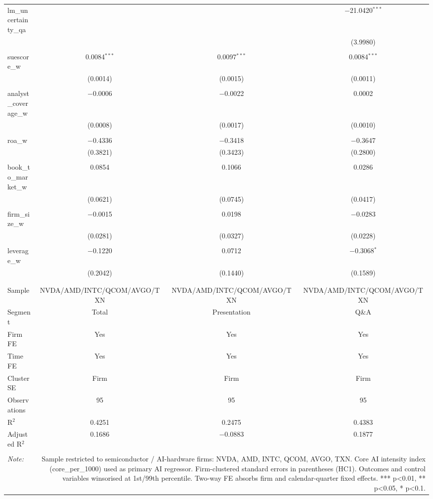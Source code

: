 \begin{table}[!htbp]
\begin{tabular}{@{\extracolsep{5pt}}lccc}
 lm\_uncertainty\_qa &  &  & $-$21.0420$^{***}$ \\ 
  &  &  & (3.9980) \\ 
  & & & \\ 
 suescore\_w & 0.0084$^{***}$ & 0.0097$^{***}$ & 0.0084$^{***}$ \\ 
  & (0.0014) & (0.0015) & (0.0011) \\ 
  & & & \\ 
 analyst\_coverage\_w & $-$0.0006 & $-$0.0022 & 0.0002 \\ 
  & (0.0008) & (0.0017) & (0.0010) \\ 
  & & & \\ 
 roa\_w & $-$0.4336 & $-$0.3418 & $-$0.3647 \\ 
  & (0.3821) & (0.3423) & (0.2800) \\ 
  & & & \\ 
 book\_to\_market\_w & 0.0854 & 0.1066 & 0.0286 \\ 
  & (0.0621) & (0.0745) & (0.0417) \\ 
  & & & \\ 
 firm\_size\_w & $-$0.0015 & 0.0198 & $-$0.0283 \\ 
  & (0.0281) & (0.0327) & (0.0228) \\ 
  & & & \\ 
 leverage\_w & $-$0.1220 & 0.0712 & $-$0.3068$^{*}$ \\ 
  & (0.2042) & (0.1440) & (0.1589) \\ 
  & & & \\ 
\hline \\[-1.8ex] 
Sample & NVDA/AMD/INTC/QCOM/AVGO/TXN & NVDA/AMD/INTC/QCOM/AVGO/TXN & NVDA/AMD/INTC/QCOM/AVGO/TXN \\ 
Segment & Total & Presentation & Q\&A \\ 
Firm FE & Yes & Yes & Yes \\ 
Time FE & Yes & Yes & Yes \\ 
Cluster SE & Firm & Firm & Firm \\ 
Observations & 95 & 95 & 95 \\ 
R$^{2}$ & 0.4251 & 0.2475 & 0.4383 \\ 
Adjusted R$^{2}$ & 0.1686 & $-$0.0883 & 0.1877 \\ 
\hline 
\hline \\[-1.8ex] 
\textit{Note:}  & \multicolumn{3}{r}{Sample restricted to semiconductor / AI-hardware firms: NVDA, AMD, INTC, QCOM, AVGO, TXN. Core AI intensity index (core_per_1000) used as primary AI regressor. Firm-clustered standard errors in parentheses (HC1). Outcomes and control variables winsorised at 1st/99th percentile. Two-way FE absorbs firm and calendar-quarter fixed effects. *** p<0.01, ** p<0.05, * p<0.1.} \\ 
\end{tabular} 
\end{table} 
